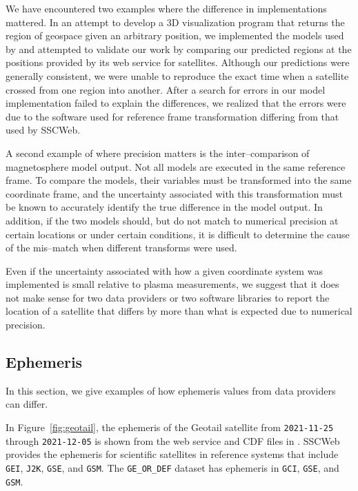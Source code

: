 \documentclass[draft]{agujournal2019}
\begin{document}
We have encountered two examples where the difference in implementations mattered. In an attempt to develop a 3D visualization program that returns the region of geospace given an arbitrary position, we implemented the models used by \cite{SSCWeb} and attempted to validate our work by comparing our predicted regions at the positions provided by its web service for satellites. Although our predictions were generally consistent, we were unable to reproduce the exact time when a satellite crossed from one region into another. After a search for errors in our model implementation failed to explain the differences, we realized that the errors were due to the software used for reference frame transformation differing from that used by SSCWeb.

A second example of where precision matters is the inter--comparison of magnetosphere model output. Not all models are executed in the same reference frame. To compare the models, their variables must be transformed into the same coordinate frame, and the uncertainty associated with this transformation must be known to accurately identify the true difference in the model output. In addition, if the two models should, but do not match to numerical precision at certain locations or under certain conditions, it is difficult to determine the cause of the mis--match when different transforms were used. 

Even if the uncertainty associated with how a given coordinate system was implemented is small relative to plasma measurements, we suggest that it does not make sense for two data providers or two software libraries to report the location of a satellite that differs by more than what is expected due to numerical precision.


\subsection{Ephemeris}
\label{sect:comparisons_ephemeris}

In this section, we give examples of how ephemeris values from data providers can differ.

In Figure~\ref{fig:geotail}, the ephemeris of the Geotail satellite from \texttt{2021-11-25} through \texttt{2021-12-05} is shown from the  web service and CDF files in . SSCWeb provides the ephemeris for scientific satellites in reference systems that include \texttt{GEI}, \texttt{J2K}, \texttt{GSE}, and \texttt{GSM}. The \texttt{GE\_OR\_DEF} dataset has ephemeris in \texttt{GCI}, \texttt{GSE}, and \texttt{GSM}.
\end{document}
